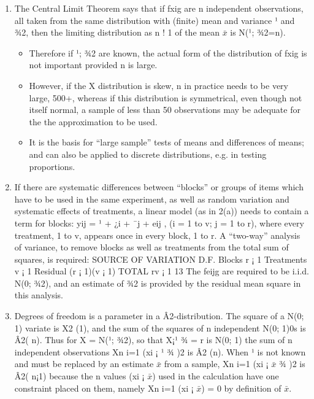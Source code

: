 \documentclass[a4paper,12pt]{article}
\begin{document}
\begin{enumerate}
\item  The Central Limit Theorem says that if fxig are n independent observations,
all taken from the same distribution with (finite) mean and variance ¹ and
¾2, then the limiting distribution as n ! 1 of the mean $\bar{x}$ is N(¹; ¾2=n).

\begin{itemize}
\item Therefore if ¹; ¾2 are known, the actual form of the distribution of fxig is
not important provided n is large. 
\item However, if the X distribution is skew,
n in practice needs to be very large, 500+, whereas if this distribution is
symmetrical, even though not itself normal, a sample of less than 50 observations
may be adequate for the the approximation to be used.
\item It is the basis
for “large sample” tests of means and differences of means; and can also be
applied to discrete distributions, e.g. in testing proportions.
\end{itemize}

\item  If there are systematic differences between “blocks” or groups of items which
have to be used in the same experiment, as well as random variation and
systematic effects of treatments, a linear model (as in 2(a)) needs to contain
a term for blocks: yij = ¹ + ¿i + ¯j + eij , (i = 1 to v; j = 1 to r), where
every treatment, 1 to v, appears once in every block, 1 to r. A “two-way”
analysis of variance, to remove blocks as well as treatments from the total
sum of squares, is required:
SOURCE OF VARIATION D.F.
Blocks r ¡ 1
Treatments v ¡ 1
Residual (r ¡ 1)(v ¡ 1)
TOTAL rv ¡ 1
13
The feijg are required to be i.i.d. N(0; ¾2), and an estimate of ¾2 is provided
by the residual mean square in this analysis.
\item  Degrees of freedom is a parameter in a Â2-distribution. The square of a
N(0; 1) variate is X2
(1), and the sum of the squares of n independent N(0; 1)0s
is Â2(
n). Thus for X = N(¹; ¾2), so that X¡¹
¾ = r is N(0; 1) the sum of n
independent observations
Xn
i=1
(xi ¡ ¹
¾
)2 is Â2
(n). When ¹ is not known and
must be replaced by an estimate $\bar{x}$ from a sample,
Xn
i=1
(xi ¡ $\bar{x}$
¾
)2 is Â2(
n¡1)
because the n values (xi ¡ $\bar{x}$) used in the calculation have one constraint
placed on them, namely
Xn
i=1
(xi ¡ $\bar{x}$) = 0 by definition of $\bar{x}$. 


\end{enumerate}
\end{document}
